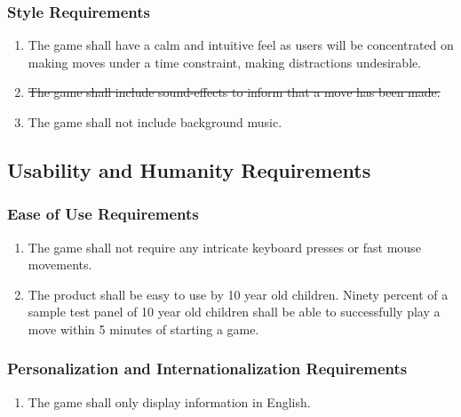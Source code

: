 \documentclass[12pt, titlepage]{article}
\begin{document}
    \subsubsection{Style Requirements}
    \begin{enumerate}[{LF}1., leftmargin=2\parindent, resume]
    	\item The game shall have a calm and intuitive feel as users will be concentrated on making moves under a time constraint, making distractions undesirable.
    	\item \sout{The game shall include sound-effects to inform that a move has been made.}
    	\item The game shall not include background music.
    \end{enumerate}
    
    
    \subsection{Usability and Humanity Requirements}
    
    \subsubsection{Ease of Use Requirements}
    \begin{enumerate}[{UH}1., leftmargin=2\parindent]
        \item The game shall not require any intricate keyboard presses or fast mouse movements.
        \item The product shall be easy to use by 10 year old children. Ninety percent of a sample test panel of 10 year old children shall be able to successfully play a move within 5 minutes of starting a game.
    \end{enumerate}
    
    \subsubsection{Personalization and Internationalization Requirements}
    \begin{enumerate}[{UH}1., leftmargin=2\parindent, resume]
    	\item The game shall only display information in English.
    \end{enumerate}
    
\end{document}
